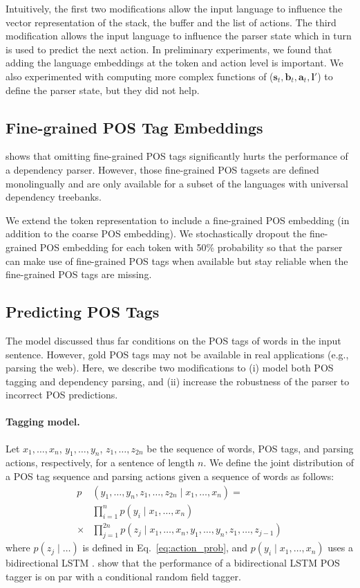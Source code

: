 \documentclass[11pt]{article}
\begin{document}
Intuitively, the first two modifications allow the input language to influence the vector representation of the stack, the buffer and the list of actions.
The third modification allows the input language to influence the parser state which in turn is used to predict the next action.
In preliminary experiments, we found that adding the language embeddings at the token and action level is important.
We also experimented with computing more complex functions of ($\mathbf{s}_t, \mathbf{b}_t, \mathbf{a}_t, \mathbf{l'}$) to define the parser state, but they did not help.

\subsection{Fine-grained POS Tag Embeddings}
\label{sec:fine_grained}
 shows that omitting fine-grained POS tags significantly hurts the performance of a dependency parser.
However, those fine-grained POS tagsets are defined monolingually and are only available for a subset of the languages with universal dependency treebanks.

We extend the token representation to include a fine-grained POS embedding (in addition to the coarse POS embedding).
We stochastically dropout the fine-grained POS embedding for each token with 50\% probability \cite{srivastava:14} so that the parser can make use of fine-grained POS tags when available but stay reliable when the fine-grained POS tags are missing.

\subsection{Predicting POS Tags}
\label{sec:joint}
The model discussed thus far conditions on the POS tags of words in the input sentence.
However, gold POS tags may not be available in real applications (e.g., parsing the web).
Here, we describe two modifications to (i) model both POS tagging and dependency parsing, and (ii) increase the robustness of the parser to incorrect POS predictions.

\paragraph{Tagging model.}
Let $x_1, \ldots, x_n$, $y_1,\ldots, y_n$, $z_1, \ldots, z_{2n}$ be the sequence of words, POS tags, and parsing actions, respectively, for a sentence of length $n$.
We define the joint distribution of a POS tag sequence and parsing actions given a sequence of words as follows:
\begin{align}
p&(y_1,\ldots, y_n, z_1, \ldots,z_{2n} \mid x_1,\ldots,x_n) = \nonumber \\
&\prod_{i=1}^{n} p(y_i \mid x_1,\ldots,x_n) \nonumber \\
\times& \prod_{j=1}^{2n} p(z_j \mid x_1, \ldots, x_n, y_1, \ldots, y_n, z_1, \ldots, z_{j-1}) \nonumber
\end{align}
where $p(z_j \mid \ldots)$ is defined in Eq.~\ref{eq:action_prob}, and $p(y_i \mid x_1, \ldots, x_n)$ uses a bidirectional LSTM \cite{graves:13}.
 show that the performance of a bidirectional LSTM POS tagger is on par with a conditional random field tagger.
\end{document}

